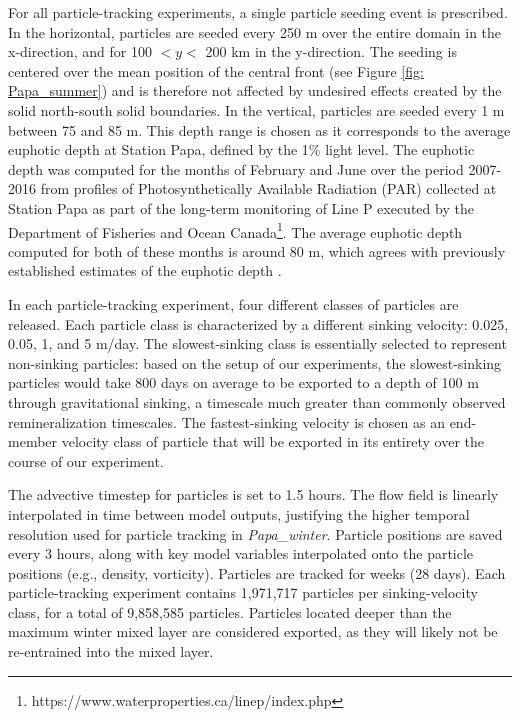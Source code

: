 \documentclass[article,linenumbers]{agujournal2018}
\begin{document}
	For all particle-tracking experiments, a single particle seeding event is prescribed. In the horizontal, particles are seeded every 250 m over the entire domain in the x-direction, and for 100 $<y<$ 200 km in the y-direction. The seeding is centered over the mean position of the central front (see Figure \ref{fig: Papa_summer}) and is therefore not affected by undesired effects created by the solid north-south solid boundaries. In the vertical, particles are seeded every 1 m between 75 and 85 m. This depth range is chosen as it corresponds to the average euphotic depth at Station Papa, defined by the 1\% light level. The euphotic depth was computed for the months of February and June over the period 2007-2016 from profiles of Photosynthetically Available Radiation (PAR) collected at Station Papa as part of the long-term monitoring of Line P executed by the Department of Fisheries and Ocean Canada\footnote{https://www.waterproperties.ca/linep/index.php}. The average euphotic depth computed for both of these months is around 80 m, which agrees with previously established estimates of the euphotic depth \citep{Sherry_1999,Harrison_2004}.
	
	In each particle-tracking experiment, four different classes of particles are released. Each particle class is characterized by a different sinking velocity: 0.025, 0.05, 1, and 5 m/day. The slowest-sinking class is essentially selected to represent non-sinking particles: based on the setup of our experiments, the slowest-sinking particles would take 800 days on average to be exported to a depth of 100 m through gravitational sinking, a timescale much greater than commonly observed remineralization timescales. The fastest-sinking velocity is chosen as an end-member velocity class of particle that will be exported in its entirety over the course of our experiment. %
	
	The advective timestep for particles is set to 1.5 hours. The flow field is linearly interpolated in time between model outputs, justifying the higher temporal resolution used for particle tracking in \textit{Papa\_winter}. Particle positions are saved every 3 hours, along with key model variables interpolated onto the particle positions (e.g., density, vorticity). Particles are tracked for  weeks (28 days). Each particle-tracking experiment contains 1,971,717 particles per sinking-velocity class, for a total of 9,858,585 particles. Particles located deeper than the maximum winter mixed layer \citep[i.e., 100 m;][]{Pelland_2016, Plant_2016} are considered exported, as they will likely not be re-entrained into the mixed layer.
	
\end{document}
